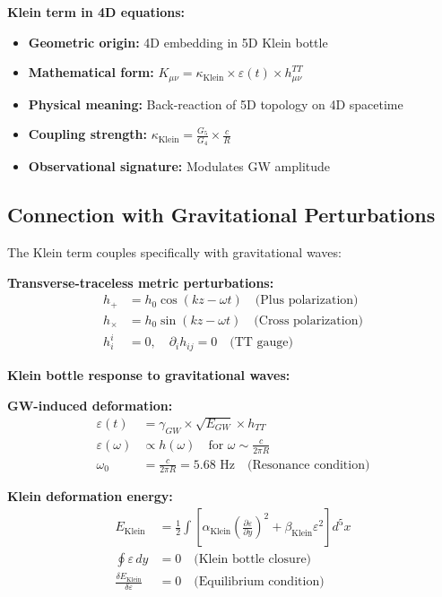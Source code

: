 \documentclass[12pt,a4paper]{article}
\begin{document}
\textbf{Klein term in 4D equations:}
\begin{itemize}
\item \textbf{Geometric origin:} 4D embedding in 5D Klein bottle
\item \textbf{Mathematical form:} $K_{\mu\nu} = \kappa_{\text{Klein}} \times \varepsilon(t) \times h_{\mu\nu}^{TT}$
\item \textbf{Physical meaning:} Back-reaction of 5D topology on 4D spacetime
\item \textbf{Coupling strength:} $\kappa_{\text{Klein}} = \frac{G_5}{G_4} \times \frac{c}{R}$
\item \textbf{Observational signature:} Modulates GW amplitude
\end{itemize}

\subsection{Connection with Gravitational Perturbations}

The Klein term couples specifically with gravitational waves:

\textbf{Transverse-traceless metric perturbations:}
\begin{align}
h_+ &= h_0 \cos(kz - \omega t) \quad \text{(Plus polarization)}\\
h_\times &= h_0 \sin(kz - \omega t) \quad \text{(Cross polarization)}\\
h_i^i &= 0, \quad \partial_i h_{ij} = 0 \quad \text{(TT gauge)}
\end{align}

\textbf{Klein bottle response to gravitational waves:}

\textbf{GW-induced deformation:}
\begin{align}
\varepsilon(t) &= \gamma_{GW} \times \sqrt{E_{GW}} \times h_{TT}\\
\varepsilon(\omega) &\propto h(\omega) \quad \text{for } \omega \sim \frac{c}{2\pi R}\\
\omega_0 &= \frac{c}{2\pi R} = 5.68 \text{ Hz} \quad \text{(Resonance condition)}
\end{align}

\textbf{Klein deformation energy:}
\begin{align}
E_{\text{Klein}} &= \frac{1}{2} \int \left[\alpha_{\text{Klein}} \left(\frac{\partial\varepsilon}{\partial y}\right)^2 + \beta_{\text{Klein}} \varepsilon^2\right] d^5x\\
\oint \varepsilon \, dy &= 0 \quad \text{(Klein bottle closure)}\\
\frac{\delta E_{\text{Klein}}}{\delta\varepsilon} &= 0 \quad \text{(Equilibrium condition)}
\end{align}
\end{document}
